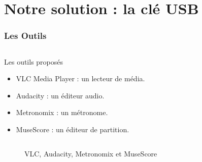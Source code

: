 \section{Notre solution : la clé USB}
\begin{frame}
\tableofcontents[currentsection]
\end{frame}

\begin{frame}
  \frametitle{Les Outils}
  \begin{columns}[t]
    \begin{column}{10cm}
      \begin{exampleblock}{Les outils proposés}
	\begin{itemize}
	\item VLC Media Player : un lecteur de média.
	\item Audacity : un éditeur audio.
	\item Metronomix : un métronome.
        \item MuseScore : un éditeur de partition.
	\end{itemize}
      \end{exampleblock} 
    \end{column}
  \end{columns}
  \begin{figure}[!h]
    \label{VLC, Audacity, Metronomix et MuseScore} 
    \caption{VLC, Audacity, Metronomix et MuseScore}
  \end{figure}        
\end{frame}

